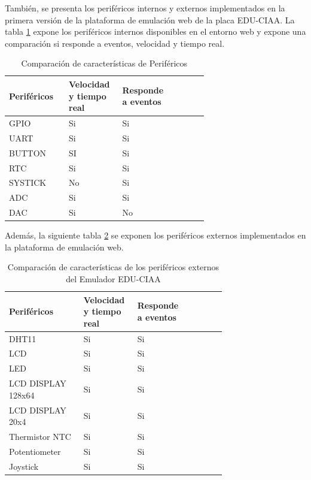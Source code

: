 \hfill \break
\hfill \break
\hfill \break
\hfill \break
\hfill \break
\hfill \break
\hfill \break
\hfill \break
\hfill \break
\hfill \break
\hfill \break
\hfill \break
\hfill \break
\hfill \break
\hfill \break

También, se presenta los periféricos internos y externos implementados en la primera versión de la plataforma de emulación web de la placa EDU-CIAA. La tabla \ref{tab:perifericosInternosCIAA} expone los  periféricos internos disponibles en el entorno web y expone una comparación si responde a eventos, velocidad y tiempo real.


\begin{table}[h]
\centering
\caption[Comparación de características de periféricos internos del Emulador EDU-CIAA]{Comparación de características de Periféricos}
\begin{tabular}{p{0.24\linewidth} p{0.14\linewidth}  p{0.14\linewidth}  p{0.14\linewidth}}
\toprule
\textbf{Periféricos} 
& \textbf{Velocidad y tiempo real}
& \textbf{Responde a eventos}
\\
\midrule
GPIO & Si & Si  \\
UART & Si & Si \\
BUTTON & SI & Si \\
RTC & Si & Si  \\
SYSTICK & No & Si \\
ADC & Si & Si \\
DAC & Si & No \\
\bottomrule
\hline
\end{tabular}
\label{tab:perifericosInternosCIAA}
\end{table}


Además, la siguiente tabla \ref{tab:perifericosExternosCIAA} se exponen los  periféricos externos implementados en la plataforma de emulación web.

\hfill \break
\hfill \break

\begin{table}[h]
\centering
\caption[Comparación de características de periféricos externos del Emulador EDU-CIAA]{Comparación de características de los periféricos externos del Emulador EDU-CIAA}
\begin{tabular}{p{0.30\linewidth} p{0.14\linewidth}  p{0.14\linewidth}  p{0.14\linewidth}}
\toprule
\textbf{Periféricos} 
& \textbf{Velocidad y tiempo real}
& \textbf{Responde a eventos}
\\
\midrule
DHT11 & Si & Si  \\
LCD & Si & Si  \\
LED & Si & Si  \\
LCD DISPLAY 128x64 & Si & Si \\
LCD DISPLAY 20x4 & Si & Si \\
Thermistor NTC & Si & Si \\
Potentiometer & Si & Si \\
Joystick & Si & Si \\
\bottomrule
\hline
\end{tabular}
\label{tab:perifericosExternosCIAA}
\end{table}


